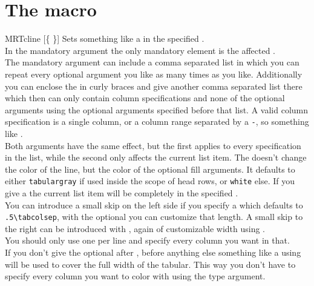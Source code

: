 \section{The  macro}\label{sec:tab:cline}%
\begin{describemacro}{MRTcline}%
  [\meta{!}\{\meta{*}%
  \}]
  Sets something like a  in the specified .
  \\[\parskip]
  In the mandatory argument the only mandatory element is the affected
  .
  \\[\parskip]
  The mandatory argument can include a comma separated list in which you can
  repeat every optional argument you like as many times as you like.
  Additionally you can enclose the  in curly braces and give another
  comma separated list there which then can only contain column specifications
  and none of the optional arguments using the optional arguments specified
  before that list. A valid column specification is a single column, or a column
  range separated by a \texttt{-}, so something like .
  \\[\parskip]
  Both  arguments have the same effect, but the first applies to
  every specification in the list, while the second only affects the current
  list item. The  doesn't change the color of the line, but the
  color of the optional fill arguments. It defaults to either
  \texttt{tabulargray} if used inside the scope of head rows, or \texttt{white}
  else. If you give a \meta{*} the current list item will be completely in the
  specified .
  \\[\parskip]
  You can introduce a small skip on the left side if you specify a \meta{<}
  which defaults to \verb|.5\tabcolsep|, with the optional  you
  can customize that length. A small skip to the right can be introduced with
  \meta{>}, again of customizable width using .
  \\[\parskip]
  You should only use one  per line and specify every column you
  want in that.
  \\[\parskip]
  If you don't give the optional \meta{!} after , before anything
  else something like a  using  will be used to cover the
  full width of the tabular. This way you don't have to specify every column you
  want to color with  using the \meta{*} type argument.
\end{describemacro}%

